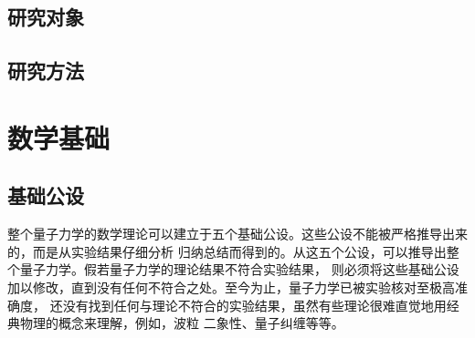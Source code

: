 \documentclass{fduthesis}
\begin{document}
\section{研究对象}

\section{研究方法}

\chapter{数学基础}

\section{基础公设}

整个量子力学的数学理论可以建立于五个基础公设。这些公设不能被严格推导出来的，而是从实验结果仔细分析
归纳总结而得到的。从这五个公设，可以推导出整个量子力学。假若量子力学的理论结果不符合实验结果，
则必须将这些基础公设加以修改，直到没有任何不符合之处。至今为止，量子力学已被实验核对至极高准确度，
还没有找到任何与理论不符合的实验结果，虽然有些理论很难直觉地用经典物理的概念来理解，例如，波粒
二象性、量子纠缠等等\cite{zurek2014quantum,cohen2013claude,zettili2003quantum}。
\end{document}
